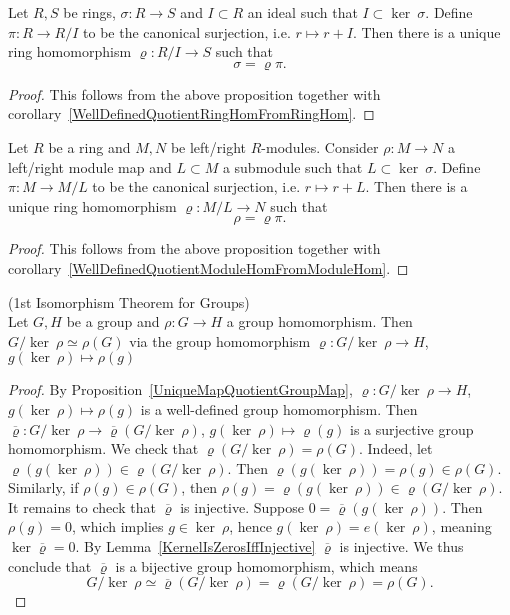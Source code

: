 \begin{corollary}\label{UniqueMapQuotientRingMap}
    Let $R,S$ be rings, $\sigma : R \rightarrow S$ and $I\subset R$ an ideal such that $I \subset \ker \ \sigma$. Define $\pi : R \rightarrow R/I $ to be the canonical surjection, i.e. $r\mapsto r + I$. Then there is a unique ring homomorphism $\varrho : R/I \rightarrow S$ such that  
    $$\sigma = \varrho \pi.$$
\end{corollary}
\begin{proof}
    This follows from the above proposition together with corollary~\ref{WellDefinedQuotientRingHomFromRingHom}. 
\end{proof}
\begin{corollary}\label{UniqueMapQuotientModuleMap}
    Let $R$ be a ring and $M,N$ be left/right $R$-modules. Consider $\rho : M \rightarrow N$ a left/right module map and $L\subset M$ a submodule such that $L \subset \ker \ \sigma$. Define $\pi : M \rightarrow M/L $ to be the canonical surjection, i.e. $r\mapsto r + L$. Then there is a unique ring homomorphism $\varrho : M/L \rightarrow N$ such that  
    $$\rho = \varrho \pi.$$
\end{corollary}
\begin{proof}
    This follows from the above proposition together with corollary~\ref{WellDefinedQuotientModuleHomFromModuleHom}. 
\end{proof}
\begin{theorem}\label{1stIsomorphismTheoremForGroups}(1st Isomorphism Theorem for Groups)\\
    Let $G,H$ be a group and $\rho : G \rightarrow H$ a group homomorphism. Then $G/\ker \ \rho \simeq \rho(G)$ via the group homomorphism $\varrho : G/\ker\ \rho \rightarrow H$, $g(\ker \ \rho)\mapsto \rho(g)$ 
\end{theorem}
\begin{proof}
    By Proposition~\ref{UniqueMapQuotientGroupMap}, $\varrho : G/\ker\ \rho \rightarrow H$, $g(\ker \ \rho)\mapsto \rho(g)$ is a well-defined group homomorphism. Then  $\overline{\varrho} : G/\ker\ \rho \rightarrow \overline{\varrho}(G/\ker\ \rho) $, $g(\ker \ \rho)\mapsto \varrho(g)$ is a surjective group homomorphism. We check that $\varrho(G/\ker\ \rho) = \rho(G)$. Indeed, let $\varrho(g(\ker \ \rho))\in \varrho(G/\ker\ \rho)$. Then $\varrho(g(\ker \ \rho))=\rho(g)\in \rho(G)$. Similarly, if $\rho(g)\in \rho(G)$, then $\rho(g)=\varrho(g(\ker\ \rho))\in \varrho(G/\ker \ \rho)$. It remains to check that $\overline{\varrho}$ is injective. Suppose $0=\overline{\varrho}(g(\ker \ \rho))$. Then $\rho(g) = 0$, which implies $g\in \ker \ \rho$, hence $g(\ker \ \rho) = e(\ker \ \rho)$, meaning $\ker \overline{\varrho} = 0$. By Lemma~\ref{KernelIsZerosIffInjective} $\overline{\varrho}$ is injective. We thus conclude that $\overline{\varrho}$ is a bijective group homomorphism, which means $$G/\ker \ \rho \simeq \overline{\varrho}(G/\ker\ \rho) =\varrho(G/\ker\ \rho) = \rho(G).$$
\end{proof}
